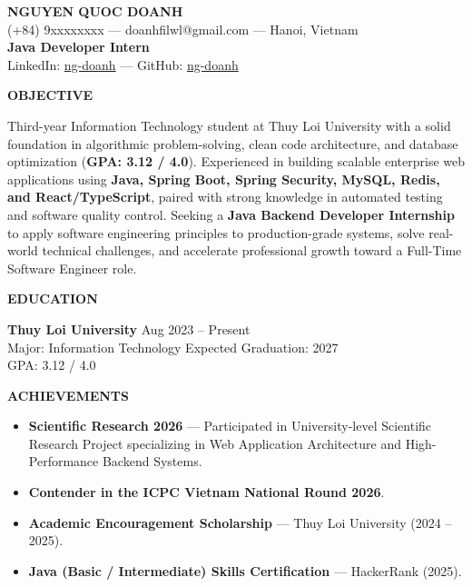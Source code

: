 ﻿\documentclass[11pt,a4paper]{article}
\newcommand{\cvsection}[1]{%
  \vspace{7pt}%
  \noindent\textbf{\large #1}\par%
  \vspace{3pt}%
}
\begin{document}
\begin{center}
    {\Large \textbf{NGUYEN QUOC DOANH}} \\[3pt]
    (+84) 9xxxxxxxx --- doanhfilwl@gmail.com --- Hanoi, Vietnam \\[2pt]
    \textbf{Java Developer Intern} \\[2pt]
    LinkedIn: \href{https://linkedin.com/in/ng-doanh}{ng-doanh} --- GitHub: \href{https://github.com/ng-doanh}{ng-doanh}
\end{center}

\vspace{-2pt}

\cvsection{OBJECTIVE}
Third-year Information Technology student at Thuy Loi University with a solid foundation in algorithmic problem-solving, clean code architecture, and database optimization (\textbf{GPA: 3.12 / 4.0}). Experienced in building scalable enterprise web applications using \textbf{Java, Spring Boot, Spring Security, MySQL, Redis, and React/TypeScript}, paired with strong knowledge in automated testing and software quality control. Seeking a \textbf{Java Backend Developer Internship} to apply software engineering principles to production-grade systems, solve real-world technical challenges, and accelerate professional growth toward a Full-Time Software Engineer role.

\cvsection{EDUCATION}
\noindent
\textbf{Thuy Loi University} \hfill Aug 2023 -- Present \\
Major: Information Technology \hfill Expected Graduation: 2027 \\
GPA: 3.12 / 4.0

\cvsection{ACHIEVEMENTS}
\begin{itemize}[leftmargin=1.5em, itemsep=2pt, topsep=2pt]
    \item \textbf{Scientific Research 2026} --- Participated in University-level Scientific Research Project specializing in Web Application Architecture and High-Performance Backend Systems.
    \item \textbf{Contender in the ICPC Vietnam National Round 2026}.
    \item \textbf{Academic Encouragement Scholarship} --- Thuy Loi University (2024 -- 2025).
    \item \textbf{Java (Basic / Intermediate) Skills Certification} --- HackerRank (2025).
\end{itemize}
\end{document}

